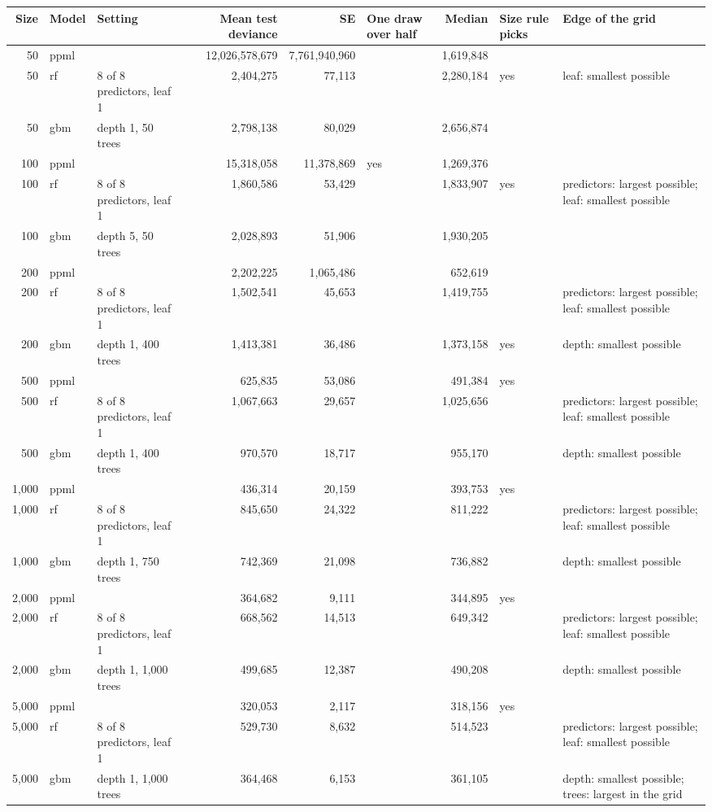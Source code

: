 \begin{tabular}{rllrrlrll}
\toprule
Size & Model & Setting & Mean test deviance & SE & One draw over half & Median & Size rule picks & Edge of the grid \\
\midrule
50 & ppml &  & 12,026,578,679 & 7,761,940,960 &  & 1,619,848 &  &  \\
50 & rf & 8 of 8 predictors, leaf 1 & 2,404,275 & 77,113 &  & 2,280,184 & yes & leaf: smallest possible \\
50 & gbm & depth 1, 50 trees & 2,798,138 & 80,029 &  & 2,656,874 &  &  \\
100 & ppml &  & 15,318,058 & 11,378,869 & yes & 1,269,376 &  &  \\
100 & rf & 8 of 8 predictors, leaf 1 & 1,860,586 & 53,429 &  & 1,833,907 & yes & predictors: largest possible; leaf: smallest possible \\
100 & gbm & depth 5, 50 trees & 2,028,893 & 51,906 &  & 1,930,205 &  &  \\
200 & ppml &  & 2,202,225 & 1,065,486 &  & 652,619 &  &  \\
200 & rf & 8 of 8 predictors, leaf 1 & 1,502,541 & 45,653 &  & 1,419,755 &  & predictors: largest possible; leaf: smallest possible \\
200 & gbm & depth 1, 400 trees & 1,413,381 & 36,486 &  & 1,373,158 & yes & depth: smallest possible \\
500 & ppml &  & 625,835 & 53,086 &  & 491,384 & yes &  \\
500 & rf & 8 of 8 predictors, leaf 1 & 1,067,663 & 29,657 &  & 1,025,656 &  & predictors: largest possible; leaf: smallest possible \\
500 & gbm & depth 1, 400 trees & 970,570 & 18,717 &  & 955,170 &  & depth: smallest possible \\
1,000 & ppml &  & 436,314 & 20,159 &  & 393,753 & yes &  \\
1,000 & rf & 8 of 8 predictors, leaf 1 & 845,650 & 24,322 &  & 811,222 &  & predictors: largest possible; leaf: smallest possible \\
1,000 & gbm & depth 1, 750 trees & 742,369 & 21,098 &  & 736,882 &  & depth: smallest possible \\
2,000 & ppml &  & 364,682 & 9,111 &  & 344,895 & yes &  \\
2,000 & rf & 8 of 8 predictors, leaf 1 & 668,562 & 14,513 &  & 649,342 &  & predictors: largest possible; leaf: smallest possible \\
2,000 & gbm & depth 1, 1,000 trees & 499,685 & 12,387 &  & 490,208 &  & depth: smallest possible \\
5,000 & ppml &  & 320,053 & 2,117 &  & 318,156 & yes &  \\
5,000 & rf & 8 of 8 predictors, leaf 1 & 529,730 & 8,632 &  & 514,523 &  & predictors: largest possible; leaf: smallest possible \\
5,000 & gbm & depth 1, 1,000 trees & 364,468 & 6,153 &  & 361,105 &  & depth: smallest possible; trees: largest in the grid \\
\bottomrule
\end{tabular}
